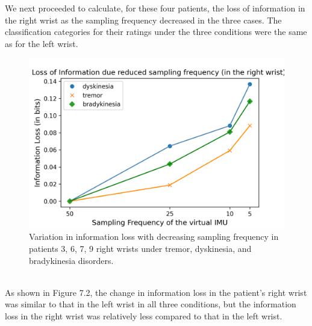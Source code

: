 We next proceeded to calculate, for these four patients, the loss of information in the right wrist as the sampling frequency decreased in the three cases. The classification categories for their ratings under the three conditions were the same as for the left wrist.
\begin{figure}[htbp]
\centering
\includegraphics[width=13cm ]{report/pics/7.2.png}
\caption{Variation in information loss with decreasing sampling frequency in patients 3, 6, 7, 9 right wrists under tremor, dyskinesia, and bradykinesia disorders.}
\end{figure}\\
As shown in Figure 7.2, the change in information loss in the patient's right wrist was similar to that in the left wrist in all three conditions, but the information loss in the right wrist was relatively less compared to that in the left wrist.\\

